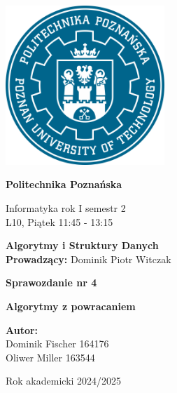 \documentclass{article}
\begin{document}
	
	
	\thispagestyle{empty} %
	
	\begin{center}
		\includegraphics[width=6cm]{Image/PP-PUT-LOGO.png}
		\vspace{1cm}
		
		{\Huge\bfseries Politechnika Poznańska}
		
		\vspace{1cm}
		
		{\large Informatyka rok I semestr 2} \\[0.3cm]
		L10, Piątek 11:45 - 13:15
		
		\vspace{1.5cm}
		
		{\LARGE\bfseries Algorytmy i Struktury Danych} \\[0.3cm]
		\textbf{Prowadzący:} Dominik Piotr Witczak
		
		\vspace{2cm}
		
		{\LARGE\bfseries Sprawozdanie nr 4} 
		
		\vspace{1cm}
		
		{\Large\bfseries Algorytmy z powracaniem}
		
		\vspace{3cm}
		
		\begin{flushright}
			\textbf{Autor:} \\[0.2cm]
			Dominik Fischer 164176 \\
			Oliwer Miller 163544
		\end{flushright}
		
		\vspace{1.5cm}
		Rok akademicki 2024/2025
	\end{center}
	
\end{document}
